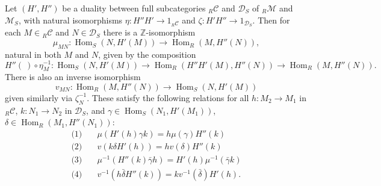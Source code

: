 Let $(H', H'')$ be a duality between full subcategories ${}_R \mathcal{C}$ and $\mathcal{D}_S$ of ${}_R \mathcal{M}$ and $\mathcal{M}_S$, with natural isomorphisms $\eta: H''H' \to 1_{{}_R \mathcal{C}}$ and $\zeta: H'H'' \to 1_{\mathcal{D}_S}$. Then for each $M \in {}_R \mathcal{C}$ and $N \in \mathcal{D}_S$ there is a $\mathbb{Z}$-isomorphism
$$\mu_{MN}: \operatorname{Hom}_S(N, H'(M)) \to \operatorname{Hom}_R(M, H''(N)),$$
natural in both $M$ and $N$, given by the composition
$$H''(\ ) \circ \eta_M^{-1}: \operatorname{Hom}_S(N, H'(M)) \to \operatorname{Hom}_R(H''H'(M), H''(N)) \to \operatorname{Hom}_R(M, H''(N)).$$
There is also an inverse isomorphism
$$v_{MN}: \operatorname{Hom}_R(M, H''(N)) \to \operatorname{Hom}_S(N, H'(M))$$
given similarly via $\zeta_N^{-1}$. These satisfy the following relations for all $h: M_2 \to M_1$ in ${}_R \mathcal{C}$, $k: N_1 \to N_2$ in $\mathcal{D}_S$, and $\gamma \in \operatorname{Hom}_S(N_1, H'(M_1))$, $\delta \in \operatorname{Hom}_R(M_1, H''(N_1))$:
\begin{align*}
\text{(1)} &\quad \mu(H'(h)\gamma k) = h\mu(\gamma) H''(k) \\
\text{(2)} &\quad v(k\delta H'(h)) = h v(\delta) H''(k) \\
\text{(3)} &\quad \mu^{-1}(H''(k)\bar{\gamma}h) = H'(h)\mu^{-1}(\bar{\gamma}k) \\
\text{(4)} &\quad v^{-1}(h\bar{\delta}H''(k)) = k v^{-1}(\bar{\delta}) H'(h).
\end{align*}
